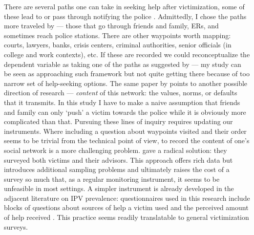\documentclass[]{interact}
\theoremstyle{plain}%
\theoremstyle{definition}
\theoremstyle{remark}
\newcommand\citep{\parencite}
\newcommand\citet{\textcite}
\begin{document}
	
	There are several paths one can take in seeking help after victimization, some of these lead to or pass through notifying the police \citep{akers2009police, kaukinen2004help}. Admittedly, I chose the paths more traveled by --- those that go through friends and family, ERs, and sometimes reach police stations. There are other waypoints worth mapping: courts, lawyers, banks, crisis centers, criminal authorities, senior officials (in college and work contexts), etc. If these are recorded we could reconceptualize the dependent variable as taking one of the paths as suggested by \citet{pescosolido1998social} --- my study can be seen as approaching such framework but not quite getting there because of too narrow set of help-seeking options. The same paper by \citet{pescosolido1998social} points to another possible direction of research --- \textit{content} of this network: the values, norms, or defaults that it transmits. In this study I have to make a naive assumption that friends and family can only `push' a victim towards the police while it is obviously more complicated than that. Pursuing these lines of inquiry requires updating our instruments. Where including a question about waypoints visited and their order seems to be trivial from the technical point of view, to record the content of one's social network is a more challenging problem. \citet{greenberg2004property} gave a radical solution: they surveyed both victims and their advisors. This approach offers rich data but introduces additional sampling problems and ultimately raises the cost of a survey so much that, as a regular monitoring instrument, it seems to be unfeasible in most settings. A simpler instrument is already developed in the adjacent literature on IPV prevalence: questionnaires used in this research include blocks of questions about sources of help a victim used and the perceived amount of help received \citep{garcia2005multi}. This practice seems readily translatable to general victimization surveys.
	
\end{document}
